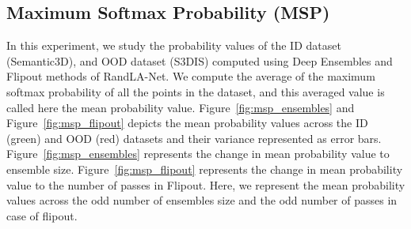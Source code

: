     \subsection{Maximum Softmax Probability (MSP)}
    \label{sec:prob_sem3dvs3dis}
    In this experiment, we study the probability values of the ID dataset (Semantic3D), and OOD dataset (S3DIS) computed using Deep Ensembles and Flipout methods of RandLA-Net.
    We compute the average of the maximum softmax probability of all the points in the dataset, and this averaged value is called here the mean probability value.
    Figure~\ref{fig:msp_ensembles} and Figure~\ref{fig:msp_flipout} depicts the mean probability values across the ID (green) and OOD (red) datasets and their variance represented as error bars.
    Figure~\ref{fig:msp_ensembles} represents the change in mean probability value to ensemble size.
    Figure~\ref{fig:msp_flipout} represents the change in mean probability value to the number of passes in Flipout.
    Here, we represent the mean probability values across the odd number of ensembles size and the odd number of passes in case of flipout.

